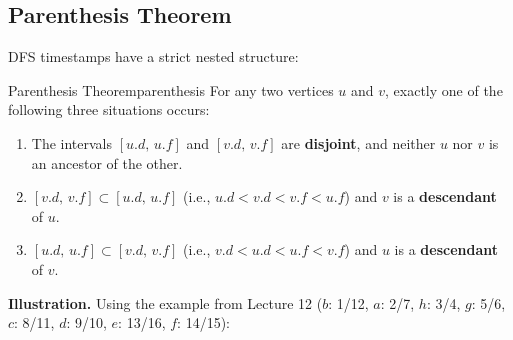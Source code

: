 
\subsection{Parenthesis Theorem}

DFS timestamps have a strict nested structure:

\begin{theorem}{Parenthesis Theorem}{parenthesis}
For any two vertices $u$ and $v$, exactly one of the following three situations occurs:
\begin{enumerate}
  \item The intervals $[u.d,\, u.f]$ and $[v.d,\, v.f]$ are \textbf{disjoint}, and
        neither $u$ nor $v$ is an ancestor of the other.
  \item $[v.d,\, v.f] \subset [u.d,\, u.f]$ (i.e., $u.d < v.d < v.f < u.f$)
        and $v$ is a \textbf{descendant} of $u$.
  \item $[u.d,\, u.f] \subset [v.d,\, v.f]$ (i.e., $v.d < u.d < u.f < v.f$)
        and $u$ is a \textbf{descendant} of $v$.
\end{enumerate}
\end{theorem}

\textbf{Illustration.} Using the example from Lecture 12 ($b$: 1/12, $a$: 2/7, $h$: 3/4,
$g$: 5/6, $c$: 8/11, $d$: 9/10, $e$: 13/16, $f$: 14/15):

\begin{center}
\end{center}

